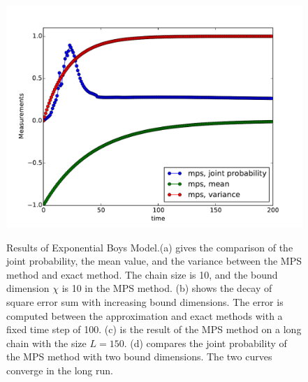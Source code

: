 \documentclass[english]{article}[12pt]
\begin{document}
\begin{figure}[H]
{\includegraphics[scale=0.4]{Result_Fig/Projection_MPS_t200_s100_bd10.pdf}}\hfill
{}
  \caption{Results of Exponential Boys Model.(a) gives the comparison of the joint probability, the mean value, and the variance between the MPS method and exact method. The chain size is 10, and the bound dimension $\chi$ is 10 in the MPS method. (b) shows the decay of square error sum with  increasing bound dimensions. The error is computed between the approximation and exact methods with a fixed time step of 100. (c) is the result of the MPS method on a long chain with the size $L=150$. (d) compares the joint probability of the MPS method with two bound dimensions. The two curves converge in the long run.}
  \label{fig:Projection_result}
\end{figure}
\end{document}
